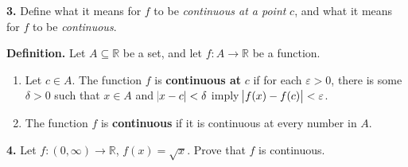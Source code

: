 \documentclass[12pt, a4paper]{article}
\begin{document}
\noindent\textbf{3. } Define what it means for $f$ to be \textit{continuous at a point} $c$, and what it means for $f$ to be \textit{continuous}.

\begin{description}

    \item\textbf{Definition.} Let $A\subseteq\mathbb{R}$ be a set, and let $f\colon A\rightarrow\mathbb{R}$ be a function.
    
    \begin{enumerate}
    
        \item Let $c\in A$. The function $f$ is \textbf{continuous at} $c$ if for each $\varepsilon>0$, there is some $\delta>0$ such that $x\in A$ and $\abs{x-c}<\delta$ imply $\abs{f(x)-f(c)}<\varepsilon$.
        \item The function $f$ is \textbf{continuous} if it is continuous at every number in $A$.
        
    \end{enumerate}
    
\end{description}

\noindent\textbf{4. } Let $f\colon(0,\infty)\rightarrow\mathbb{R}$, $f(x)=\sqrt{x}$. Prove that $f$ is continuous.
\end{document}
